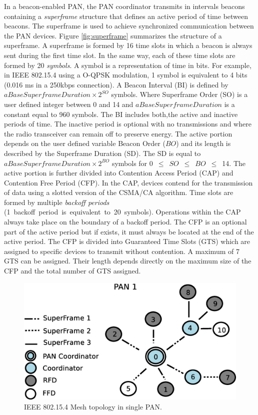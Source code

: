 \documentclass[conference]{IEEEtran}
\begin{document}
In a beacon-enabled PAN, the PAN coordinator transmits in intervals beacons containing a \textit{superframe} structure that defines an active period of time between beacons. The superframe is used to achieve synchronized communication between the PAN devices. Figure \ref{fig:superframe} summarizes the structure of a superframe. A superframe is formed by 16 time slots in which a beacon is always sent during the first time slot. In the same way, each of these time slots are formed by 20 \textit{symbols}. A symbol is a representation of time in bits. For example, in IEEE 802.15.4 using a O-QPSK modulation, 1 symbol is equivalent to 4 bits (0.016 ms in a 250kbps connection). A Beacon Interval (BI) is defined by  \mbox{$aBaseSuperframeDuration \times 2^{SO}$} symbols. Where Superframe Order (SO) is a user defined integer between 0 and 14 and $aBaseSuperframeDuration$ is a constant equal to 960 symbols. The BI includes both,the active and inactive periods of time. The inactive period is optional with no transmissions and where the radio transceiver can remain off to preserve energy. The active portion depends on the user defined variable Beacon Order ($BO$) and its length is described by the Superframe Duration (SD). The SD is equal to \mbox{$aBaseSuperframeDuration \times 2^{BO}$} symbols for \mbox{0 $\leq$ $SO$ $\leq$ $BO$ $\leq$ 14}. The active portion is further divided into Contention Access Period (CAP) and Contention Free Period (CFP). In the CAP, devices contend for the transmission of data using a slotted version of the CSMA/CA algorithm. Time slots are formed by multiple \textit{backoff periods} \mbox{(1 backoff period is equivalent to 20 symbols)}. Operations within the CAP always take place on the boundary of a backoff period. The CFP is an optional part of the active period but if exists, it must always be located at the end of the active period. The CFP is divided into Guaranteed Time Slots (GTS) which are assigned to specific devices to transmit without contention. A maximum of 7 GTS can be assigned. Their length depends directly on the maximum size of the CFP and the total number of GTS assigned.
\begin{figure}[!htb]
\centering
\includegraphics[scale=.28]{peerTopology}
\caption{ IEEE 802.15.4 Mesh topology in single PAN.}
\label{fig:peerTopology}
\end{figure}
\end{document}
